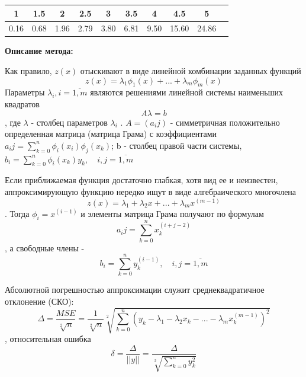 \documentclass [12pt]{article}
\begin{document}
\begin{table}[h]
\begin{center}
\begin{tabular}{|c|c|c|c|c|c|c|c|c|c|}
\hline
1 & 1.5 & 2 & 2.5 & 3 & 3.5 & 4 & 4.5 & 5\\
\hline
0.16 & 0.68 & 1.96 & 2.79 & 3.80 & 6.81 & 9.50 & 15.60 & 24.86\\
\hline
\end{tabular}
\end{center}
\end{table}

\textbf{Описание метода:}

Как правило, $z(x)$ отыскивают в виде линейной комбинации заданных функций $$ z(x) = \lambda_{1}\phi_{1}(x) + ... + \lambda_m\phi_m(x) $$
Параметры $\lambda_i, i = \overline{1,m}$ являются решениями линейной системы наименьших квадратов $$ A\lambda = b $$,
где $\lambda$ - столбец параметров $\lambda_i$ . $A = (a_ij)$ - симметричная положительно определенная матрица (матрица Грама) с коэффициентами $ a_ij = \sum\limits_{k = 0}^n{\phi_i(x_i)\phi_j(x_k)}$; b - столбец правой части системы, $ b_i = \sum\limits_{k = 0}^n{\phi_i(x_k)y_k}, \quad i,j = \overline{1,m} $


Если приближаемая функция достаточно глабкая, хотя вид ее и неизвестен, аппроксимирующую функцию нередко ищут в виде алгебраического многочлена $$ z(x) = \lambda_{1} + \lambda_{2}x + ... + \lambda_{m}x^(m-1) $$.
Тогда $\phi_i = x^(i-1)$ и элементы матрица Грама получают по формулам $$ a_ij = \sum\limits_{k = 0}^n{x_{k}^(i + j - 2)}$$,
а свободные члены - $$b_i = \sum\limits_{k = 0}^n{y_{k}^(i - 1)}, \quad i, j = \overline{1,m} $$

Абсолютной погрешностью аппроксимации служит среднеквадратичное отклонение (СКО): $$ \Delta = \frac{MSE}{\sqrt[2]{n}} = \frac{1}{\sqrt[2]{n}}\sqrt[2]{\sum\limits_{k = 0}^n{(y_k - \lambda_{1} - \lambda_{2}x_k - ... -\lambda_{m}x_{k}^(m-1))^2}} $$, 
относительная ошибка $$ \delta = \frac{\Delta}{||y||} = \frac{\Delta}{\sqrt[2]{\sum\limits_{k = 0}^n{y_{k}^2}}} $$
\end{document}
